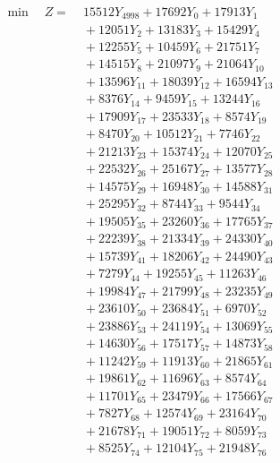 \documentclass[a4paper,10pt]{article}
\begin{document}
\allowdisplaybreaks
{\small
\begin{align}
\min \quad Z = &\; 15512 Y_{4998} + 17692 Y_{0} + 17913 Y_{1} \\[0.3ex]
&\;  + 12051 Y_{2} + 13183 Y_{3} + 15429 Y_{4} \\[0.3ex]
&\;  + 12255 Y_{5} + 10459 Y_{6} + 21751 Y_{7} \\[0.3ex]
&\;  + 14515 Y_{8} + 21097 Y_{9} + 21064 Y_{10} \\[0.3ex]
&\;  + 13596 Y_{11} + 18039 Y_{12} + 16594 Y_{13} \\[0.3ex]
&\;  + 8376 Y_{14} + 9459 Y_{15} + 13244 Y_{16} \\[0.3ex]
&\;  + 17909 Y_{17} + 23533 Y_{18} + 8574 Y_{19} \\[0.3ex]
&\;  + 8470 Y_{20} + 10512 Y_{21} + 7746 Y_{22} \\[0.3ex]
&\;  + 21213 Y_{23} + 15374 Y_{24} + 12070 Y_{25} \\[0.3ex]
&\;  + 22532 Y_{26} + 25167 Y_{27} + 13577 Y_{28} \\[0.5ex]\allowbreak
&\;  + 14575 Y_{29} + 16948 Y_{30} + 14588 Y_{31} \\[0.3ex]
&\;  + 25295 Y_{32} + 8744 Y_{33} + 9544 Y_{34} \\[0.3ex]
&\;  + 19505 Y_{35} + 23260 Y_{36} + 17765 Y_{37} \\[0.3ex]
&\;  + 22239 Y_{38} + 21334 Y_{39} + 24330 Y_{40} \\[0.3ex]
&\;  + 15739 Y_{41} + 18206 Y_{42} + 24490 Y_{43} \\[0.3ex]
&\;  + 7279 Y_{44} + 19255 Y_{45} + 11263 Y_{46} \\[0.3ex]
&\;  + 19984 Y_{47} + 21799 Y_{48} + 23235 Y_{49} \\[0.3ex]
&\;  + 23610 Y_{50} + 23684 Y_{51} + 6970 Y_{52} \\[0.3ex]
&\;  + 23886 Y_{53} + 24119 Y_{54} + 13069 Y_{55} \\[0.3ex]
&\;  + 14630 Y_{56} + 17517 Y_{57} + 14873 Y_{58} \\[0.5ex]\allowbreak
&\;  + 11242 Y_{59} + 11913 Y_{60} + 21865 Y_{61} \\[0.3ex]
&\;  + 19861 Y_{62} + 11696 Y_{63} + 8574 Y_{64} \\[0.3ex]
&\;  + 11701 Y_{65} + 23479 Y_{66} + 17566 Y_{67} \\[0.3ex]
&\;  + 7827 Y_{68} + 12574 Y_{69} + 23164 Y_{70} \\[0.3ex]
&\;  + 21678 Y_{71} + 19051 Y_{72} + 8059 Y_{73} \\[0.3ex]
&\;  + 8525 Y_{74} + 12104 Y_{75} + 21948 Y_{76} \\[0.3ex]

\end{align}}
\end{document}
